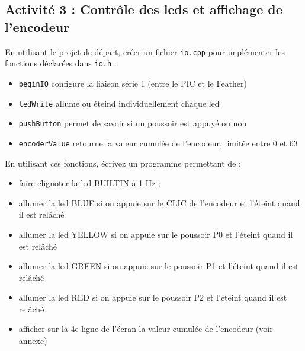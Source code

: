 \documentclass[11pt]{paper}
\begin{document}
%
%
%

\subsection*{Activité 3 : Contrôle des leds et affichage de l'encodeur}

En utilisant le  \href{https://gitlab.univ-nantes.fr/hladik-pe-1/ecn-sint-tp/-/tree/main/TP1-serie/code/tp1?ref_type=heads}{projet de départ}, créer un fichier {\tt io.cpp} pour implémenter les fonctions déclarées dans {\tt io.h} :
\begin{itemize}
	\item {\tt beginIO} configure la liaison série 1 (entre le PIC et le Feather)
	\item {\tt ledWrite} allume ou éteind individuellement chaque led
	\item {\tt pushButton} permet de savoir si un poussoir est appuyé ou non
	\item {\tt encoderValue} retourne la valeur cumulée de l’encodeur, limitée entre 0 et 63\\
\end{itemize}

En utilisant ces fonctions, écrivez un programme permettant de :
\begin{itemize}
	\item  faire clignoter la led BUILTIN à 1 Hz ;
	\item allumer la led BLUE si on appuie sur le CLIC de l’encodeur et l’éteint quand il est relâché
	\item allumer la led YELLOW si on appuie sur le poussoir P0 et l’éteint quand il est relâché
	\item allumer la led GREEN si on appuie sur le poussoir P1 et l’éteint quand il est relâché
	\item allumer la led RED si on appuie sur le poussoir P2 et l’éteint quand il est relâché
	\item afficher sur la 4e ligne de l'écran la valeur cumulée de l'encodeur (voir annexe) \\
\end{itemize}
\end{document}
